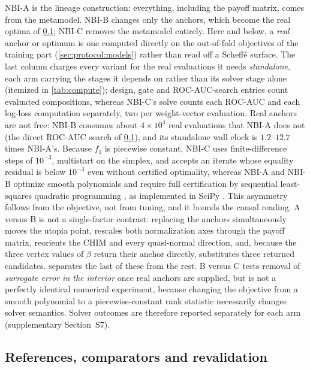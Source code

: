 NBI-A is the lineage construction: everything, including the payoff matrix, comes from the metamodel. NBI-B changes
only the anchors, which become the real optima of \cref{sec:method:refs}; NBI-C removes the metamodel entirely.
Here and below, a \emph{real} anchor or optimum is one computed directly on the out-of-fold objectives of the training
part (\cref{sec:protocol:models}) rather than read off a Scheff\'e surface.
The last column charges every variant for the real evaluations it needs \emph{standalone}, each arm carrying the
stages it depends on rather than its solver stage alone (itemized in \cref{tab:compute}); design, gate and
ROC-AUC-search entries count evaluated compositions, whereas NBI-C's solve counts each ROC-AUC and each log-loss
computation separately, two per weight-vector evaluation. Real anchors are not free: NBI-B consumes about
$4\times10^{4}$ real evaluations that NBI-A does not (the direct ROC-AUC search of \cref{sec:method:refs}), and
its standalone wall clock is $1.2$--$12.7$ times NBI-A's.
Because $f_1$ is piecewise constant, NBI-C uses finite-difference steps of $10^{-3}$, multistart on the simplex, and
accepts an iterate whose equality residual is below $10^{-3}$ even without certified optimality,
whereas NBI-A and NBI-B optimize smooth polynomials and require full certification by sequential least-squares
quadratic programming \citep[SLSQP;][]{kraft1988software}, as implemented in SciPy \citep{virtanen2020scipy}. This asymmetry follows from
the objective, not from tuning, and it bounds the causal reading. A versus B is not a single-factor contrast:
replacing the anchors simultaneously moves the utopia point, rescales both normalization axes through the payoff
matrix, reorients the CHIM and every quasi-normal direction, and, because the three vertex values of $\beta$ return
their anchor directly, substitutes three returned candidates.  separates the last of these
from the rest. B versus C tests removal of
\emph{surrogate error in the interior} once real anchors are supplied, but is not a perfectly identical numerical
experiment, because changing the objective from a smooth polynomial to a piecewise-constant rank statistic
necessarily changes solver semantics. Solver outcomes are therefore reported separately for each arm
(supplementary Section~S7).

\subsection{References, comparators and revalidation}
\label{sec:method:refs}

